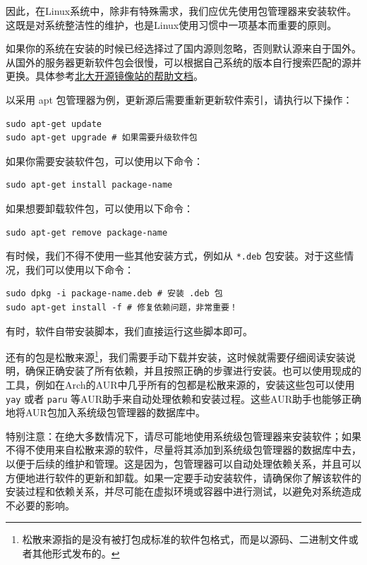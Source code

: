 因此，在Linux系统中，除非有特殊需求，我们应优先使用包管理器来安装软件。这既是对系统整洁性的维护，也是Linux使用习惯中一项基本而重要的原则。

如果你的系统在安装的时候已经选择过了国内源则忽略，否则默认源来自于国外。从国外的服务器更新软件包会很慢，可以根据自己系统的版本自行搜索匹配的源并更换。具体参考\href{https://mirrors.pku.edu.cn/Help}{北大开源镜像站的帮助文档}。

以采用 apt 包管理器为例，更新源后需要重新更新软件索引，请执行以下操作：

\begin{verbatim}
sudo apt-get update
sudo apt-get upgrade # 如果需要升级软件包
\end{verbatim}

如果你需要安装软件包，可以使用以下命令：
\begin{verbatim}
sudo apt-get install package-name
\end{verbatim}

如果想要卸载软件包，可以使用以下命令：
\begin{verbatim}
sudo apt-get remove package-name
\end{verbatim}

有时候，我们不得不使用一些其他安装方式，例如从 \texttt{*.deb} 包安装。对于这些情况，我们可以使用以下命令：

\begin{verbatim}
sudo dpkg -i package-name.deb # 安装 .deb 包
sudo apt-get install -f # 修复依赖问题，非常重要！
\end{verbatim}

有时，软件自带安装脚本，我们直接运行这些脚本即可。

还有的包是松散来源\footnote{松散来源指的是没有被打包成标准的软件包格式，而是以源码、二进制文件或者其他形式发布的。}，我们需要手动下载并安装，这时候就需要仔细阅读安装说明，确保正确安装了所有依赖，并且按照正确的步骤进行安装。也可以使用现成的工具，例如在Arch的AUR中几乎所有的包都是松散来源的，安装这些包可以使用 \verb|yay| 或者 \verb|paru| 等AUR助手来自动处理依赖和安装过程。这些AUR助手也能够正确地将AUR包加入系统级包管理器的数据库中。

特别注意：在绝大多数情况下，请尽可能地使用系统级包管理器来安装软件；如果不得不使用来自松散来源的软件，尽量将其添加到系统级包管理器的数据库中去，以便于后续的维护和管理。这是因为，包管理器可以自动处理依赖关系，并且可以方便地进行软件的更新和卸载。如果一定要手动安装软件，请确保你了解该软件的安装过程和依赖关系，并尽可能在虚拟环境或容器中进行测试，以避免对系统造成不必要的影响。

